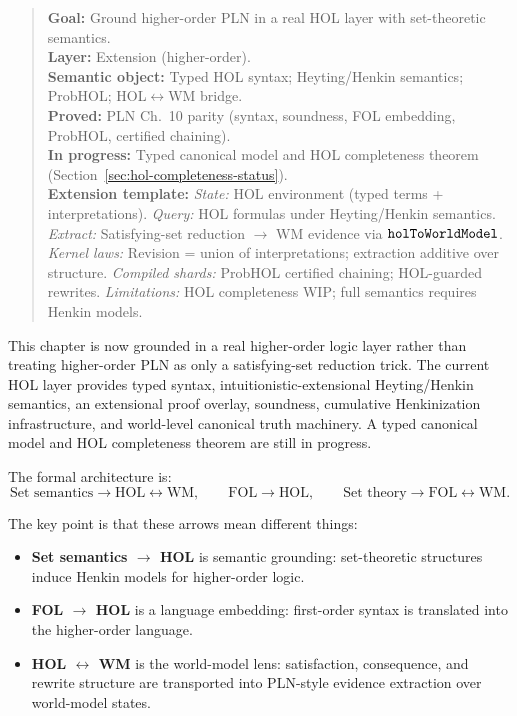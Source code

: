 \documentclass[11pt,openany]{report}
\begin{document}
\begin{quote}\small
\textbf{Goal:} Ground higher-order PLN in a real HOL layer with set-theoretic semantics.\\
\textbf{Layer:} Extension (higher-order).\\
\textbf{Semantic object:} Typed HOL syntax; Heyting/Henkin semantics; ProbHOL; HOL$\leftrightarrow$WM bridge.\\
\textbf{Proved:} PLN Ch.~10 parity (syntax, soundness, FOL embedding, ProbHOL, certified chaining).\\
\textbf{In progress:} Typed canonical model and HOL completeness theorem (Section~\ref{sec:hol-completeness-status}).\\[4pt]
\textbf{Extension template:}
\textit{State:} HOL environment (typed terms + interpretations).
\textit{Query:} HOL formulas under Heyting/Henkin semantics.
\textit{Extract:} Satisfying-set reduction $\to$ WM evidence via $\texttt{holToWorldModel}$.
\textit{Kernel laws:} Revision = union of interpretations; extraction additive over structure.
\textit{Compiled shards:} ProbHOL certified chaining; HOL-guarded rewrites.
\textit{Limitations:} HOL completeness WIP; full semantics requires Henkin models.
\end{quote}

This chapter is now grounded in a real higher-order logic layer rather than
treating higher-order PLN as only a satisfying-set reduction trick.
The current HOL layer provides typed syntax, intuitionistic-extensional
Heyting/Henkin semantics, an extensional proof overlay, soundness, cumulative
Henkinization infrastructure, and world-level canonical truth machinery.
A typed canonical model and HOL completeness theorem are still in progress.

The formal architecture is:
\[
  \text{Set semantics} \longrightarrow \text{HOL} \longleftrightarrow \text{WM},
  \qquad
  \text{FOL} \longrightarrow \text{HOL},
  \qquad
  \text{Set theory} \longrightarrow \text{FOL} \longleftrightarrow \text{WM}.
\]

The key point is that these arrows mean different things:
\begin{itemize}
\item \textbf{Set semantics $\to$ HOL} is semantic grounding: set-theoretic
  structures induce Henkin models for higher-order logic.
\item \textbf{FOL $\to$ HOL} is a language embedding: first-order syntax is
  translated into the higher-order language.
\item \textbf{HOL $\leftrightarrow$ WM} is the world-model lens: satisfaction,
  consequence, and rewrite structure are transported into PLN-style evidence
  extraction over world-model states.
\end{itemize}
\end{document}
